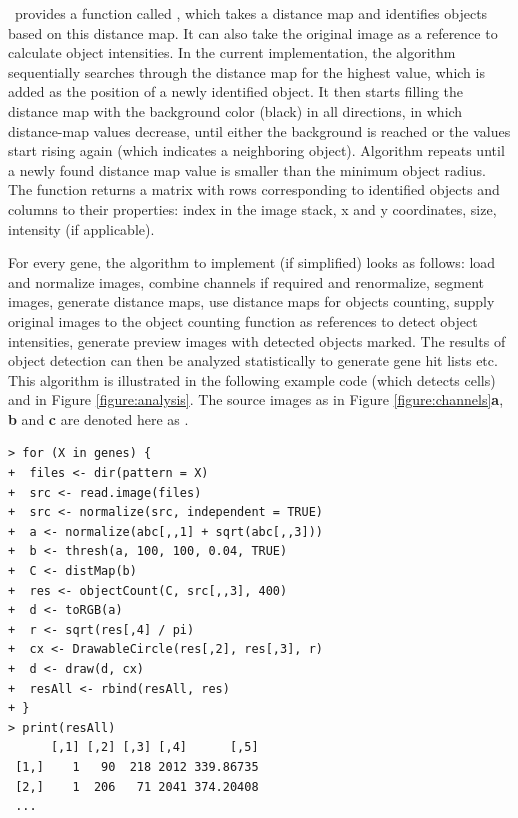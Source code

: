 \EBImage\ provides a function called , which takes a distance map and identifies objects based on this distance map. It can also take the original image as a reference to calculate object intensities. In the current implementation, the algorithm sequentially searches through the distance map for the highest value, which is added as the position of a newly identified object. It then starts filling the distance map with the background color (black) in all directions, in which distance-map values decrease, until either the background is reached or the values start rising again (which indicates a neighboring object). Algorithm repeats until a newly found distance map value is smaller than the minimum object radius. The function returns a matrix with rows corresponding to identified objects and columns to their properties: index in the image stack, x and y coordinates, size, intensity (if applicable).

For every gene, the algorithm to implement (if simplified) looks as follows: load and normalize images, combine channels if required and renormalize, segment images, generate distance maps, use distance maps for objects counting, supply original images to the object counting function as references to detect object intensities, generate preview images with detected objects marked. The results of object detection can then be analyzed statistically to generate gene hit lists etc. This algorithm is illustrated in the following example code (which detects cells) and in Figure \ref{figure:analysis}. The source images as in Figure \ref{figure:channels}{\bf a}, {\bf b} and {\bf c} are denoted here as .

\begin{verbatim}
> for (X in genes) {
+  files <- dir(pattern = X)
+  src <- read.image(files)
+  src <- normalize(src, independent = TRUE)
+  a <- normalize(abc[,,1] + sqrt(abc[,,3]))
+  b <- thresh(a, 100, 100, 0.04, TRUE)
+  C <- distMap(b)
+  res <- objectCount(C, src[,,3], 400)
+  d <- toRGB(a)
+  r <- sqrt(res[,4] / pi)
+  cx <- DrawableCircle(res[,2], res[,3], r)
+  d <- draw(d, cx)
+  resAll <- rbind(resAll, res)
+ }
> print(resAll)
      [,1] [,2] [,3] [,4]      [,5]
 [1,]    1   90  218 2012 339.86735
 [2,]    1  206   71 2041 374.20408
 ...
\end{verbatim}

